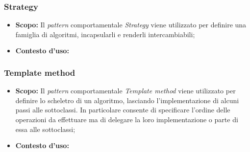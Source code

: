 \subsubsection{Strategy}
\begin{itemize}
\item \textbf{Scopo:}
Il \textit{pattern} comportamentale \textit{Strategy} viene utilizzato per definire una famiglia di algoritmi, incapsularli e renderli intercambiabili;

\item \textbf{Contesto d'uso:}
\end{itemize}

\subsubsection{Template method}
\begin{itemize}
\item \textbf{Scopo:}
Il \textit{pattern} comportamentale \textit{Template method} viene utilizzato per definire lo scheletro di un algoritmo, lasciando l'implementazione di alcuni passi alle sottoclassi. In particolare consente di specificare l'ordine delle operazioni da effettuare ma di delegare la loro implementazione o parte di essa alle sottoclassi;

\item \textbf{Contesto d'uso:}
\end{itemize}
